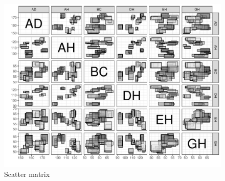\documentclass[article]{jss}
\begin{document}
\begin{appendix}
\begin{figure}[t!]
\centering
\includegraphics[width=1\textwidth]{pic/scaMatrix}
\caption{\label{fig:scaMatrix} Scatter matrix}
\end{figure}




\end{appendix}
\end{document}
